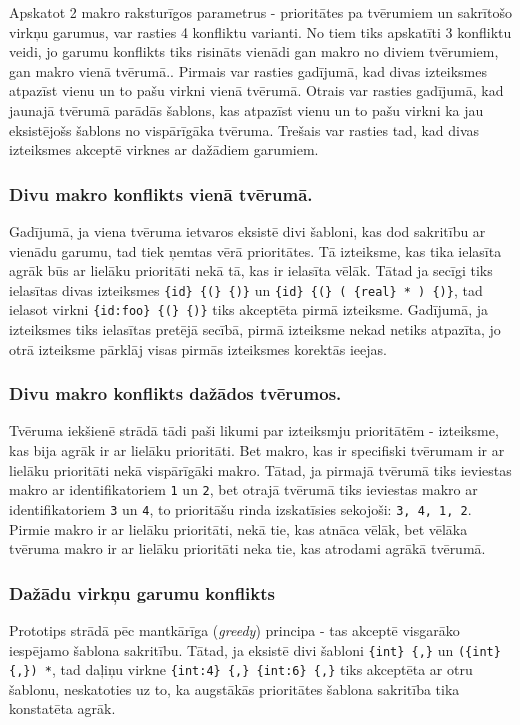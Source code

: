 Apskatot 2 makro raksturīgos parametrus - prioritātes pa tvērumiem un sakrītošo virkņu garumus, var rasties 4 konfliktu varianti. No tiem tiks apskatīti 3 konfliktu veidi, jo garumu konflikts tiks risināts vienādi gan makro no diviem tvērumiem, gan makro vienā tvērumā.. Pirmais var rasties gadījumā, kad divas izteiksmes atpazīst vienu un to pašu virkni vienā tvērumā. Otrais var rasties gadījumā, kad jaunajā tvērumā parādās šablons, kas atpazīst vienu un to pašu virkni ka jau eksistējošs šablons no vispārīgāka tvēruma. Trešais var rasties tad, kad divas izteiksmes akceptē virknes ar dažādiem garumiem.

\subsubsection{Divu makro konflikts vienā tvērumā.}

Gadījumā, ja viena tvēruma ietvaros eksistē divi šabloni, kas dod sakritību ar vienādu garumu, tad tiek ņemtas vērā prioritātes. Tā izteiksme, kas tika ielasīta agrāk būs ar lielāku prioritāti nekā tā, kas ir ielasīta vēlāk. Tātad ja secīgi tiks ielasītas divas izteiksmes \verb|{id} {(} {)}| un \verb|{id} {(} ( {real} * ) {)}|, tad ielasot virkni \verb|{id:foo} {(} {)}| tiks akceptēta pirmā izteiksme. Gadījumā, ja izteiksmes tiks ielasītas pretējā secībā, pirmā izteiksme nekad netiks atpazīta, jo otrā izteiksme pārklāj visas pirmās izteiksmes korektās ieejas.

\subsubsection{Divu makro konflikts dažādos tvērumos.}

Tvēruma iekšienē strādā tādi paši likumi par izteiksmju prioritātēm - izteiksme, kas bija agrāk ir ar lielāku prioritāti. Bet makro, kas ir specifiski tvērumam ir ar lielāku prioritāti nekā vispārīgāki makro. Tātad, ja pirmajā tvērumā tiks ieviestas makro ar identifikatoriem \verb|1| un \verb|2|, bet otrajā tvērumā tiks ieviestas makro ar identifikatoriem \verb|3| un \verb|4|, to prioritāšu rinda izskatīsies sekojoši: \verb|3, 4, 1, 2|. Pirmie makro ir ar lielāku prioritāti, nekā tie, kas atnāca vēlāk, bet vēlāka tvēruma makro ir ar lielāku prioritāti neka tie, kas atrodami agrākā tvērumā.

\subsubsection{Dažādu virkņu garumu konflikts}
Prototips strādā pēc mantkārīga (\emph{greedy}) principa - tas akceptē visgarāko iespējamo šablona sakritību. Tātad, ja eksistē divi šabloni \verb|{int} {,}| un \verb|({int} {,}) *|, tad daļiņu virkne \verb|{int:4} {,} {int:6} {,}| tiks akceptēta ar otru šablonu, neskatoties uz to, ka augstākās prioritātes šablona sakritība tika konstatēta agrāk.


